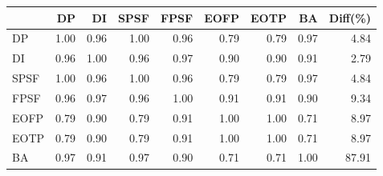 \begin{tabular}{l|rrrrrrr|r}
\toprule
 & DP & DI & SPSF & FPSF & EOFP & EOTP & BA & Diff(\%)  \\
\midrule
DP & 1.00 & 0.96 & 1.00 & 0.96 & 0.79 & 0.79 & 0.97 & 4.84  \\
DI & 0.96 & 1.00 & 0.96 & 0.97 & 0.90 & 0.90 & 0.91 & 2.79  \\
SPSF & 1.00 & 0.96 & 1.00 & 0.96 & 0.79 & 0.79 & 0.97 & 4.84  \\
FPSF & 0.96 & 0.97 & 0.96 & 1.00 & 0.91 & 0.91 & 0.90 & 9.34  \\
EOFP & 0.79 & 0.90 & 0.79 & 0.91 & 1.00 & 1.00 & 0.71 & 8.97  \\
EOTP & 0.79 & 0.90 & 0.79 & 0.91 & 1.00 & 1.00 & 0.71 & 8.97  \\
BA & 0.97 & 0.91 & 0.97 & 0.90 & 0.71 & 0.71 & 1.00 & 87.91  \\
\bottomrule
\end{tabular}

